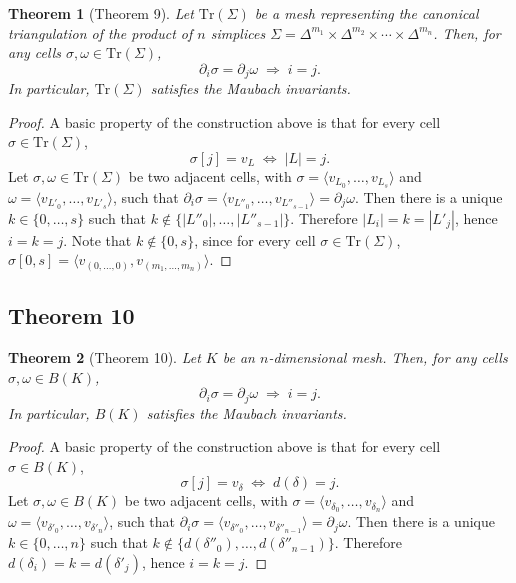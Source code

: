 \documentclass[11pt]{article}
\newtheorem*{thmthm}{Theorem}
\begin{document}
\begin{thmthm}[Theorem 9]
Let $\mathrm{Tr}(\Sigma)$ be a mesh representing the canonical
triangulation of the product of $n$ simplices $\Sigma=\Delta^{m_1}\times
\Delta^{m_2}\times\cdots\times\Delta^{m_n}$. Then, for any cells
$\sigma,\omega\in\mathrm{Tr}(\Sigma)$,
\[
  \partial_i\sigma=\partial_j\omega \;\Longrightarrow\; i=j.
\]
In particular, $\mathrm{Tr}(\Sigma)$ satisfies the Maubach invariants.
\end{thmthm}

\begin{proof}
A basic property of the construction above is that for every cell
$\sigma\in\mathrm{Tr}(\Sigma)$,
\[
  \sigma[j]=v_L \;\Longleftrightarrow\; |L|=j .
\]
Let $\sigma,\omega\in\mathrm{Tr}(\Sigma)$ be two adjacent cells, with
$\sigma=\langle v_{L_0},\dots,v_{L_s}\rangle$ and $\omega=\langle
v_{L'_0},\dots,v_{L'_s}\rangle$, such that $\partial_i\sigma=\langle
v_{L''_0},\dots,v_{L''_{s-1}}\rangle=\partial_j\omega$. Then there is a
unique $k\in\{0,\dots,s\}$ such that $k\notin\{|L''_0|,\dots,|L''_{s-1}|\}$.
Therefore $|L_i|=k=|L'_j|$, hence $i=k=j$. Note that $k\notin\{0,s\}$,
since for every cell $\sigma\in\mathrm{Tr}(\Sigma)$, $\sigma[0,s]=\langle
v_{(0,\dots,0)},v_{(m_1,\dots,m_n)}\rangle$.
\end{proof}

\subsection*{Theorem 10}

\begin{thmthm}[Theorem 10]
Let $K$ be an $n$-dimensional mesh. Then, for any cells $\sigma,\omega\in
B(K)$,
\[
  \partial_i\sigma=\partial_j\omega \;\Longrightarrow\; i=j.
\]
In particular, $B(K)$ satisfies the Maubach invariants.
\end{thmthm}

\begin{proof}
A basic property of the construction above is that for every cell
$\sigma\in B(K)$,
\[
  \sigma[j]=v_\delta \;\Longleftrightarrow\; d(\delta)=j .
\]
Let $\sigma,\omega\in B(K)$ be two adjacent cells, with $\sigma=\langle
v_{\delta_0},\dots,v_{\delta_n}\rangle$ and $\omega=\langle
v_{\delta'_0},\dots,v_{\delta'_n}\rangle$, such that $\partial_i\sigma=
\langle v_{\delta''_0},\dots,v_{\delta''_{n-1}}\rangle=\partial_j\omega$.
Then there is a unique $k\in\{0,\dots,n\}$ such that $k\notin\{
d(\delta''_0),\dots,d(\delta''_{n-1})\}$. Therefore $d(\delta_i)=k=
d(\delta'_j)$, hence $i=k=j$.
\end{proof}
\end{document}
